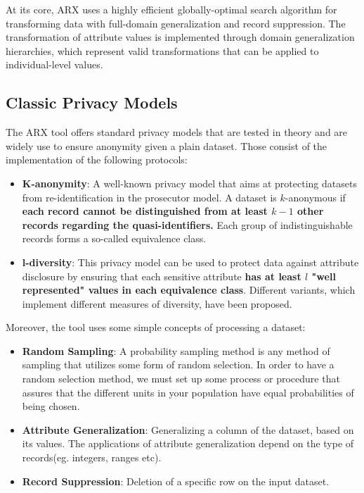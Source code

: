 At its core, ARX uses a highly efficient globally-optimal search algorithm for transforming data with full-domain generalization and record suppression. The transformation of attribute values is implemented through domain generalization hierarchies, which represent valid transformations that can be applied to individual-level values.

\subsection{Classic Privacy Models}

The ARX tool offers standard privacy models that are tested in theory and are widely use to ensure anonymity given a plain dataset. Those consist of the implementation of the following protocols:

\begin{itemize}
    \item \textbf{K-anonymity}: A well-known privacy model that aims at protecting datasets from re-identification in the prosecutor model. A dataset is $k$-anonymous if\textbf{ each record cannot be distinguished from at least $k-1$ other records regarding the quasi-identifiers.} Each group of indistinguishable records forms a so-called equivalence class. 
    \item \textbf{l-diversity}: This privacy model can be used to protect data against attribute disclosure by ensuring that each sensitive attribute \textbf{has at least $l$ "well represented" values in each equivalence class}. Different variants, which implement different measures of diversity, have been proposed.
\end{itemize}

Moreover, the tool uses some simple concepts of processing a dataset:

\begin{itemize}
    \item \textbf{Random Sampling}: A probability sampling method is any method of sampling that utilizes some form of random selection. In order to have a random selection method, we must set up some process or procedure that assures that the different units in your population have equal probabilities of being chosen.
    \item \textbf{Attribute Generalization}: Generalizing a column of the dataset, based on its values. The applications of attribute generalization depend on the type of records(eg. integers, ranges etc).
    \item \textbf{Record Suppression}: Deletion of a specific row on the input dataset.
\end{itemize}

